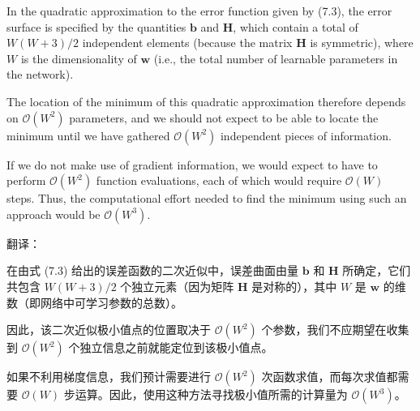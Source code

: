 \documentclass{article}
\begin{document}
In the quadratic approximation to the error function given by (7.3), the error surface is specified by the quantities $\mathbf{b}$ and $\mathbf{H}$, which contain a total of $W(W+3)/2$ independent elements (because the matrix $\mathbf{H}$ is symmetric), where $W$ is the dimensionality of $\mathbf{w}$ (i.e., the total number of learnable parameters in the network). 

The location of the minimum of this quadratic approximation therefore depends on $\mathcal{O}(W^2)$ parameters, and we should not expect to be able to locate the minimum until we have gathered $\mathcal{O}(W^2)$ independent pieces of information. 

If we do not make use of gradient information, we would expect to have to perform $\mathcal{O}(W^2)$ function evaluations, each of which would require $\mathcal{O}(W)$ steps. Thus, the computational effort needed to find the minimum using such an approach would be $\mathcal{O}(W^3)$.

{\color{red}
翻译：

在由式 (7.3) 给出的误差函数的二次近似中，误差曲面由量 $\mathbf{b}$ 和 $\mathbf{H}$ 所确定，它们共包含 $W(W+3)/2$ 个独立元素（因为矩阵 $\mathbf{H}$ 是对称的），其中 $W$ 是 $\mathbf{w}$ 的维数（即网络中可学习参数的总数）。

因此，该二次近似极小值点的位置取决于 $\mathcal{O}(W^2)$ 个参数，我们不应期望在收集到 $\mathcal{O}(W^2)$ 个独立信息之前就能定位到该极小值点。

如果不利用梯度信息，我们预计需要进行 $\mathcal{O}(W^2)$ 次函数求值，而每次求值都需要 $\mathcal{O}(W)$ 步运算。因此，使用这种方法寻找极小值所需的计算量为 $\mathcal{O}(W^3)$。


}
\end{document}
